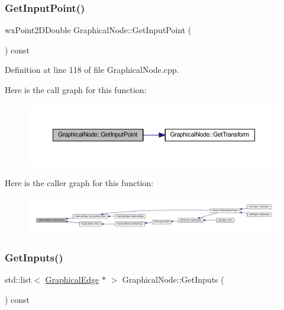 \subsubsection{\texorpdfstring{Get\+Input\+Point()}{GetInputPoint()}}
{\footnotesize\ttfamily wx\+Point2\+D\+Double Graphical\+Node\+::\+Get\+Input\+Point (\begin{DoxyParamCaption}{ }\end{DoxyParamCaption}) const\hspace{0.3cm}{\ttfamily [protected]}}



Definition at line 118 of file Graphical\+Node.\+cpp.

Here is the call graph for this function\+:
\nopagebreak
\begin{figure}[H]
\begin{center}
\leavevmode
\includegraphics[width=350pt]{class_graphical_node_a29991fc9117db0975aa1a61d0df48822_cgraph}
\end{center}
\end{figure}
Here is the caller graph for this function\+:
\nopagebreak
\begin{figure}[H]
\begin{center}
\leavevmode
\includegraphics[width=350pt]{class_graphical_node_a29991fc9117db0975aa1a61d0df48822_icgraph}
\end{center}
\end{figure}
\mbox{\label{class_graphical_node_a338a09b81d0be860210659f312fd5347}} 
\subsubsection{\texorpdfstring{Get\+Inputs()}{GetInputs()}}
{\footnotesize\ttfamily std\+::list$<$ \hyperlink{class_graphical_edge}{Graphical\+Edge} $\ast$ $>$ Graphical\+Node\+::\+Get\+Inputs (\begin{DoxyParamCaption}{ }\end{DoxyParamCaption}) const}



